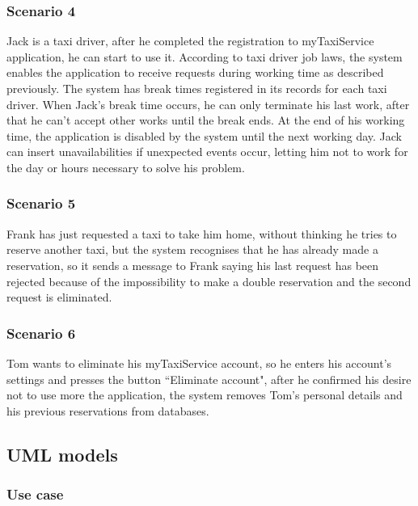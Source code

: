\documentclass[a4paper,12pt]{article}%
\begin{document}
\subsubsection{Scenario 4} 
Jack is a taxi driver, after he completed the registration to myTaxiService application, he can start to use it. According to taxi driver job laws, the system enables the application to receive requests during working time as described previously. The system has break times registered in its records for each taxi driver. When Jack's break time occurs, he can only terminate his last work, after that he can't accept other works until the break ends. At the end of his working time, the application is disabled by the system until the next working day. Jack can insert unavailabilities if unexpected events occur, letting him not to work for the day or hours necessary to solve his problem. 
\subsubsection{Scenario 5}
Frank has just requested a taxi to take him home, without thinking he tries to reserve another taxi, but the system recognises that he has already made a reservation, so it sends a message to Frank saying his last request has been rejected because of the impossibility to make a double reservation and the second request is eliminated.
\subsubsection{Scenario 6}  
Tom wants to eliminate his myTaxiService account, so he enters his account's settings and presses the button ``Eliminate account", after he confirmed his desire not to use more the application, the system removes Tom's personal details and his previous reservations from databases.

\pagebreak
\subsection{UML models}
\subsubsection{Use case} 
\end{document}
